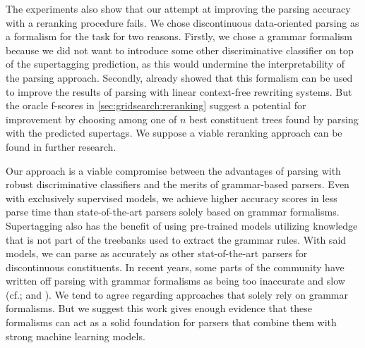 \documentclass[../document.tex]{subfiles}
\begin{document}
    The experiments also show that our attempt at improving the parsing accuracy with a reranking procedure fails.
    We chose discontinuous data-oriented parsing as a formalism for the task for two reasons.
        Firstly, we chose a grammar formalism because we did not want to introduce some other discriminative classifier on top of the supertagging prediction, as this would undermine the interpretability of the parsing approach.
        Secondly, \citet{CraSchBod16} already showed that this formalism can be used to improve the results of parsing with linear context-free rewriting systems.
    But the oracle f-scores in \cref{sec:gridsearch:reranking} suggest a potential for improvement by choosing among one of \(n\) best constituent trees found by parsing with the predicted supertags.
    We suppose a viable reranking approach can be found in further research.

    Our approach is a viable compromise between the advantages of parsing with robust discriminative classifiers and the merits of grammar-based parsers.
    Even with exclusively supervised models, we achieve higher accuracy scores in less parse time than state-of-the-art parsers solely based on grammar formalisms.
    Supertagging also has the benefit of using pre-trained models utilizing knowledge that is not part of the treebanks used to extract the grammar rules.
    With said models, we can parse as accurately as other stat-of-the-art parsers for discontinuous constituents.
    In recent years, some parts of the  community have written off parsing with grammar formalisms as being too inaccurate and slow (cf.\@ \citealp[Section~1]{StaSte20}; and \citealp[Section~10]{zhang2020survey}).
    We tend to agree regarding approaches that solely rely on grammar formalisms.
    But we suggest this work gives enough evidence that these formalisms can act as a solid foundation for parsers that combine them with strong machine learning models.
\end{document}
